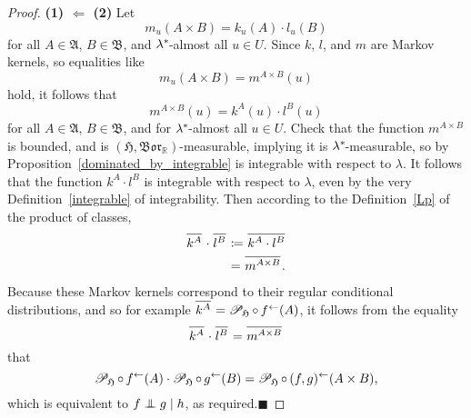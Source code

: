 \documentclass[
twoside=true,
paper=letter,
fontsize=9pt,
pagesize=auto,
leqno,
openany,
headsepline,
overfullrule,
]{scrbook}
\theoremstyle{plain}
\theoremstyle{plain}
\theoremstyle{definition}
\theoremstyle{bfnoteitalic}
\theoremstyle{bfnoteroman}
\newcommand{\sigalg}[1]{\mathfrak{#1}}
\newcommand{\cali}[1]{\mathscr{#1}}
\renewcommand{\qedsymbol}{$\blacksquare$}
\newcommand{\definedby}{\coloneqq}
\newcommand{\condprobop}[1]{\mathop{\cali{P}\hspace{-1pt}}\nolimits_{#1}}
\newcommand{\borel}{\mathfrak{Bor}}
\newcommand{\preimage}[1]{\mathop{#1^{\leftarrow}}}
\newcommand{\R}{\mathbb{R}}
\newcommand{\sigmaalgebra}{\sigalg{A}}
\newcommand{\sigmaalgebraii}{\sigalg{B}}
\newcommand{\kernast}{\ast\kern-1pt}
\newcommand{\funcf}{f}
\newcommand{\funcg}{g}
\newcommand{\funck}{k}
\newcommand{\funcl}{l}
\newcommand{\funcm}{m}
\newcommand{\function}{f}
\newcommand{\functionii}{g}
\newcommand{\functioniii}{h}
\newcommand{\measlambda}{\lambda}
\newcommand{\seti}{A}
\newcommand{\setii}{B}
\newcommand{\uspace}{U}%
\newcommand{\uspaceelt}{u}
\newcommand{\condindep}[3]{#1\perp\kern-6pt\perp #2\mid #3}
\newcommand*\xbar[1]{%
   \hbox{%
     \vbox{%
       \hrule height 0.4pt %
       \kern0.4ex%
       \hbox{%
         \ensuremath{#1}%
       }%
     }%
   }%
}
\newcommand{\lebclass}[1]{\hspace{.5pt}\xbar{#1}\hspace{0.5pt}}
\newcommand{\ellclass}[2]{\lebclass{#1}^{#2}}
\begin{document}
\begin{proof}
\textbf{(1) $\Leftarrow$ (2)}\quad
Let
\[
\funcm_\uspaceelt(\seti\times\setii)
=
\funck_\uspaceelt(\seti)
\cdot
\funcl_\uspaceelt(\setii)
\]
for all $\seti\in\sigmaalgebra$, $\setii\in\sigmaalgebraii$, and
$\measlambda^\kernast$\hyp{}almost all $\uspaceelt\in\uspace$.
Since  $\funck$, $\funcl$, and $\funcm$ are Markov kernels, so equalities like
\[
\funcm_\uspaceelt(\seti\times\setii)
=
\funcm^{\seti\times\setii}(\uspaceelt)
\]
hold, it follows that
\[
\funcm^{\seti\times\setii}(\uspaceelt)
=
\funck^\seti(\uspaceelt)
\cdot
\funcl^\setii(\uspaceelt)
\]
for all $\seti\in\sigmaalgebra$, $\setii\in\sigmaalgebraii$, and
for
$\measlambda^\kernast$\hyp{}almost all $\uspaceelt\in\uspace$.
Check that the function
$\funcm^{\seti\times\setii}$
is bounded, and is
$(\sigalg{H},\borel_\R)$\hyp{}measurable, implying it is
$\measlambda^\kernast$\hyp{}measurable, so by Proposition~\ref{dominated_by_integrable}
is integrable with respect to $\measlambda$. It follows that the function
$\funck^\seti\cdot\funcl^\setii$
is integrable with respect to $\measlambda$, even by the very Definition~\ref{integrable} of integrability.
Then according to the Definition~\ref{Lp} of the product of classes,
\begin{align*}
\ellclass{\funck^\seti}{}
\cdot
\ellclass{\funcl^\setii}{}
& \definedby
\ellclass{\funck^\seti\cdot\funcl^\setii}{} \\
& =
\ellclass{\funcm^{\seti\times\setii}}{}. \\
\end{align*}
Because these Markov kernels correspond to their regular conditional distributions, and so for example
$\ellclass{\funck^\seti}{}
=
\condprobop{\sigalg{H}}\circ \preimage{\funcf}(\seti)$,
it follows from the equality
\[
\ellclass{\funck^\seti}{}
\cdot
\ellclass{\funcl^\setii}{}
=
\ellclass{\funcm^{\seti\times\setii}}{}
\]
that
\[
\condprobop{\sigalg{H}} \circ \preimage{\funcf}(\seti)
\cdot
\condprobop{\sigalg{H}} \circ \preimage{\funcg}(\setii)
=
\condprobop{\sigalg{H}} \circ \preimage{(\funcf,\funcg)}
(\seti\times\setii),
\]
which is equivalent to
$\condindep{\function}{\functionii}{\functioniii}$,
as required.\hfill\qedsymbol




\end{proof}
\end{document}
